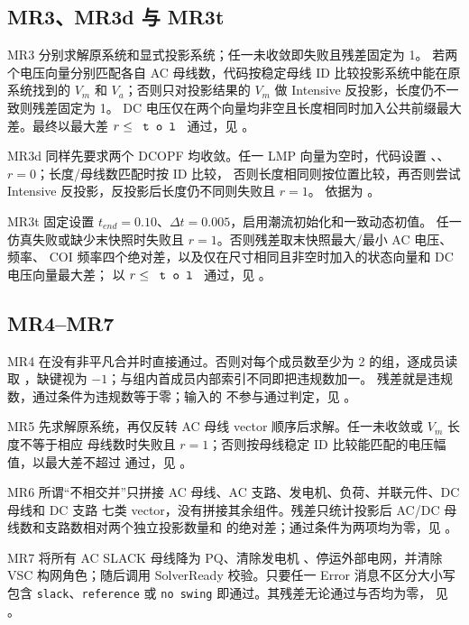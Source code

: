 \subsection{MR3、MR3d 与 MR3t}

MR3 分别求解原系统和显式投影系统；任一未收敛即失败且残差固定为 1。
若两个电压向量分别匹配各自 AC 母线数，代码按稳定母线 ID 比较投影系统中能在原系统找到的
$V_m$ 和 $V_a$；否则只对投影结果的 $V_m$ 做 Intensive 反投影，长度仍不一致则残差固定为 1。
DC 电压仅在两个向量均非空且长度相同时加入公共前缀最大差。最终以最大差
$r\le\fld{tol}$ 通过，见 。

MR3d 同样先要求两个 DCOPF 均收敛。任一 LMP 向量为空时，代码设置
、、$r=0$；长度/母线数匹配时按 ID 比较，
否则长度相同则按位置比较，再否则尝试 Intensive 反投影，反投影后长度仍不同则失败且 $r=1$。
依据为 。

MR3t 固定设置 $t_{end}=0.10$、$\Delta t=0.005$，启用潮流初始化和一致动态初值。
任一仿真失败或缺少末快照时失败且 $r=1$。否则残差取末快照最大/最小 AC 电压、频率、
COI 频率四个绝对差，以及仅在尺寸相同且非空时加入的状态向量和 DC 电压向量最大差；
以 $r\le\fld{tol}$ 通过，见 。

\subsection{MR4--MR7}

MR4 在没有非平凡合并时直接通过。否则对每个成员数至少为 2 的组，逐成员读取
，缺键视为 $-1$；与组内首成员内部索引不同即把违规数加一。
残差就是违规数，通过条件为违规数等于零；输入的  不参与通过判定，见
。

MR5 先求解原系统，再仅反转 AC 母线 vector 顺序后求解。任一未收敛或 $V_m$ 长度不等于相应
母线数时失败且 $r=1$；否则按母线稳定 ID 比较能匹配的电压幅值，以最大差不超过
 通过，见 。

MR6 所谓“不相交并”只拼接 AC 母线、AC 支路、发电机、负荷、并联元件、DC 母线和 DC 支路
七类 vector，没有拼接其余组件。残差只统计投影后 AC/DC 母线数和支路数相对两个独立投影数量和
的绝对差；通过条件为两项均为零，见 。

MR7 将所有 AC SLACK 母线降为 PQ、清除发电机 、停运外部电网，并清除 VSC
构网角色；随后调用 SolverReady 校验。只要任一 Error 消息不区分大小写包含
\texttt{slack}、\texttt{reference} 或 \texttt{no swing} 即通过。其残差无论通过与否均为零，
见 。


